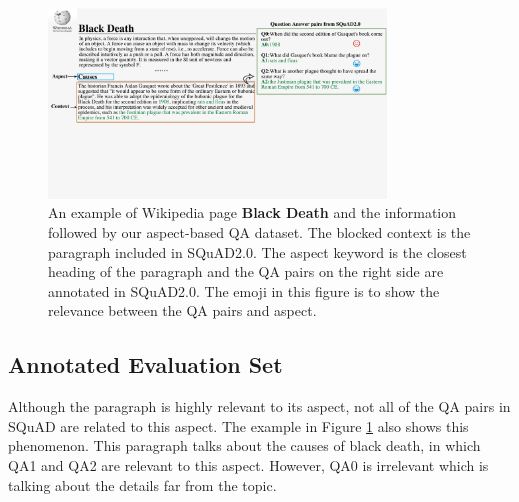 \begin{figure}[th]
    \begin{center}
    \includegraphics[width=0.8\textwidth]{pic/Wikipedia.pdf}
        \caption{\label{fig:wiki} An example of Wikipedia page \textbf{Black Death} and the information followed by our aspect-based QA dataset.
        The blocked context is the paragraph included in SQuAD2.0. The aspect keyword is the closest heading of the paragraph and the QA pairs on the right side are annotated in SQuAD2.0. The emoji in this figure is to show the relevance between the QA pairs and  aspect.}
    \end{center}
\end{figure}

\subsection{Annotated Evaluation Set}
Although the paragraph is highly relevant to its aspect, not all of the QA pairs in SQuAD are related to this aspect.
The example in Figure \ref{fig:wiki} also shows this phenomenon. 
This paragraph talks about the causes of black death, in which QA1 and QA2 are relevant to this aspect.
However, QA0 is irrelevant which is talking about the details far from the topic.

